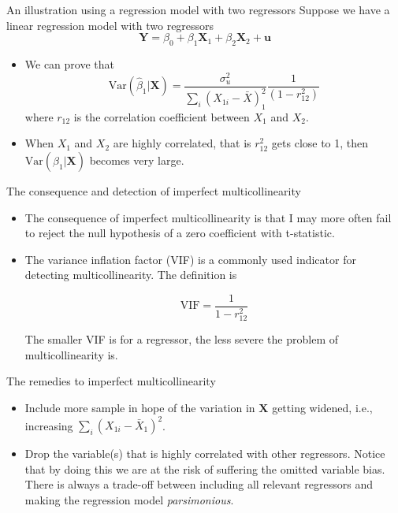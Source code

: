 \documentclass[presentation,10pt]{beamer}
\newcommand{\var}{\mathrm{Var}}
\begin{document}
\begin{frame}[label={sec:org6b97387}]{An illustration using a regression model with two regressors}
Suppose we have a linear regression model with two regressors
\begin{equation}
\label{eq:ex-collin}
\mathbf{Y} = \beta_0 + \beta_1 \mathbf{X}_1 + \beta_2 \mathbf{X}_2 + \mathbf{u}
\end{equation}

\begin{itemize}
\item We can prove that
\[\var(\hat{\beta}_1 | \mathbf{X}) =
  \frac{\sigma^2_u}{\sum_i (X_{1i} - \bar{X})_1^2} \frac{1}{(1 - r^2_{12})}\]
where \(r_{12}\) is the correlation coefficient between \(X_1\) and \(X_2\).

\item When \(X_1\) and \(X_2\) are highly correlated, that is \(r^2_{12}\) gets
close to 1, then \(\var(\hat{\beta}_1 | \mathbf{X})\) becomes very
large.
\end{itemize}
\end{frame}

\begin{frame}[label={sec:org9989c26}]{The consequence and detection of imperfect multicollinearity}
\begin{itemize}
\item The consequence of imperfect multicollinearity is that I may more
often fail to reject the null hypothesis of a zero coefficient with
t-statistic.

\item The variance inflation factor (VIF) is a commonly used indicator for
detecting multicollinearity. The definition is

\begin{equation*}
\mathrm{VIF} = \frac{1}{1 - r^2_{12}}
\end{equation*}

The smaller VIF is for a regressor, the less severe the problem of
multicollinearity is.
\end{itemize}
\end{frame}

\begin{frame}[label={sec:orgbe71bb3}]{The remedies to imperfect multicollinearity}
\begin{itemize}
\item Include more sample in hope of the variation in \(\mathbf{X}\) getting
widened, i.e., increasing \(\sum_i (X_{1i} - \bar{X}_1)^2\).

\item Drop the variable(s) that is highly correlated with other
regressors. Notice that by doing this we are at the risk of
suffering the omitted variable bias. There is always a trade-off
between including all relevant regressors and making the regression
model \emph{parsimonious}.
\end{itemize}
\end{frame}
\end{document}
